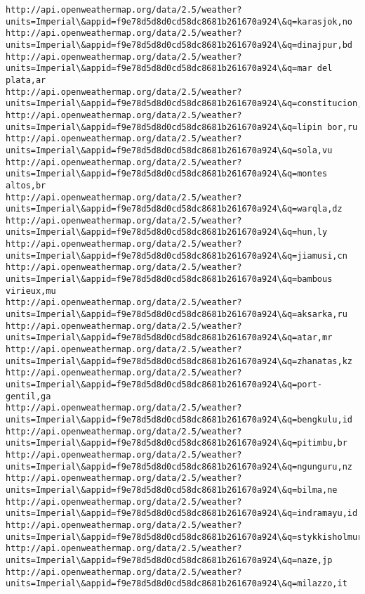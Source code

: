 \documentclass[11pt]{article}
\begin{document}
\begin{Verbatim}[commandchars=\\\{\}]
http://api.openweathermap.org/data/2.5/weather?units=Imperial\&appid=f9e78d5d8d0cd58dc8681b261670a924\&q=karasjok,no
http://api.openweathermap.org/data/2.5/weather?units=Imperial\&appid=f9e78d5d8d0cd58dc8681b261670a924\&q=dinajpur,bd
http://api.openweathermap.org/data/2.5/weather?units=Imperial\&appid=f9e78d5d8d0cd58dc8681b261670a924\&q=mar del plata,ar
http://api.openweathermap.org/data/2.5/weather?units=Imperial\&appid=f9e78d5d8d0cd58dc8681b261670a924\&q=constitucion,mx
http://api.openweathermap.org/data/2.5/weather?units=Imperial\&appid=f9e78d5d8d0cd58dc8681b261670a924\&q=lipin bor,ru
http://api.openweathermap.org/data/2.5/weather?units=Imperial\&appid=f9e78d5d8d0cd58dc8681b261670a924\&q=sola,vu
http://api.openweathermap.org/data/2.5/weather?units=Imperial\&appid=f9e78d5d8d0cd58dc8681b261670a924\&q=montes altos,br
http://api.openweathermap.org/data/2.5/weather?units=Imperial\&appid=f9e78d5d8d0cd58dc8681b261670a924\&q=warqla,dz
http://api.openweathermap.org/data/2.5/weather?units=Imperial\&appid=f9e78d5d8d0cd58dc8681b261670a924\&q=hun,ly
http://api.openweathermap.org/data/2.5/weather?units=Imperial\&appid=f9e78d5d8d0cd58dc8681b261670a924\&q=jiamusi,cn
http://api.openweathermap.org/data/2.5/weather?units=Imperial\&appid=f9e78d5d8d0cd58dc8681b261670a924\&q=bambous virieux,mu
http://api.openweathermap.org/data/2.5/weather?units=Imperial\&appid=f9e78d5d8d0cd58dc8681b261670a924\&q=aksarka,ru
http://api.openweathermap.org/data/2.5/weather?units=Imperial\&appid=f9e78d5d8d0cd58dc8681b261670a924\&q=atar,mr
http://api.openweathermap.org/data/2.5/weather?units=Imperial\&appid=f9e78d5d8d0cd58dc8681b261670a924\&q=zhanatas,kz
http://api.openweathermap.org/data/2.5/weather?units=Imperial\&appid=f9e78d5d8d0cd58dc8681b261670a924\&q=port-gentil,ga
http://api.openweathermap.org/data/2.5/weather?units=Imperial\&appid=f9e78d5d8d0cd58dc8681b261670a924\&q=bengkulu,id
http://api.openweathermap.org/data/2.5/weather?units=Imperial\&appid=f9e78d5d8d0cd58dc8681b261670a924\&q=pitimbu,br
http://api.openweathermap.org/data/2.5/weather?units=Imperial\&appid=f9e78d5d8d0cd58dc8681b261670a924\&q=ngunguru,nz
http://api.openweathermap.org/data/2.5/weather?units=Imperial\&appid=f9e78d5d8d0cd58dc8681b261670a924\&q=bilma,ne
http://api.openweathermap.org/data/2.5/weather?units=Imperial\&appid=f9e78d5d8d0cd58dc8681b261670a924\&q=indramayu,id
http://api.openweathermap.org/data/2.5/weather?units=Imperial\&appid=f9e78d5d8d0cd58dc8681b261670a924\&q=stykkisholmur,is
http://api.openweathermap.org/data/2.5/weather?units=Imperial\&appid=f9e78d5d8d0cd58dc8681b261670a924\&q=naze,jp
http://api.openweathermap.org/data/2.5/weather?units=Imperial\&appid=f9e78d5d8d0cd58dc8681b261670a924\&q=milazzo,it

\end{Verbatim}
\end{document}
